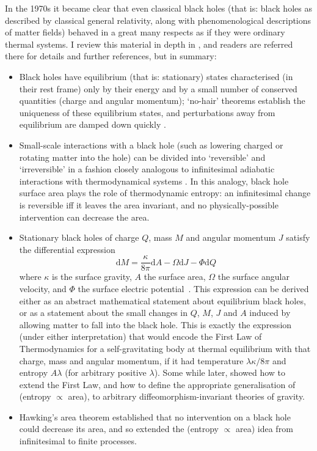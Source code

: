 \documentclass[12pt]{article}
\newcommand{\be}{\begin{equation}}
\newcommand{\ee}{\end{equation}}
\begin{document}
In the 1970s it became clear that even classical black holes (that is: black holes as described by classical general relativity, along with phenomenological descriptions of matter fields) behaved in a great many respects as if they were ordinary thermal systems. I review this material in depth in , and readers are referred there for details and further references, but in summary:
\begin{itemize}
\item Black holes have equilibrium (that is: stationary) states characterised (in their rest frame) only by their energy and by a small number of conserved quantities (charge and angular momentum); `no-hair' theorems \cite{carter1979} establish the uniqueness of these equilibrium states, and perturbations away from equilibrium are damped down quickly \cite[chs.VI-VII]{membraneparadigm}.
\item Small-scale interactions with a black hole (such as lowering charged or rotating matter into the hole) can be divided into `reversible' and `irreversible' in a fashion closely analogous to infinitesimal adiabatic interactions with thermodynamical systems \cite{christodolouruffini}. In this analogy, black hole surface area plays the role of thermodynamic entropy: an infinitesimal change is reversible iff it leaves the area invariant, and no physically-possible intervention can decrease the area. 
\item Stationary black holes of charge $Q$, mass $M$ and angular momentum $J$ satisfy the differential expression 
\be
\mathrm{d}M = \frac{\kappa}{8\pi} \mathrm{d}A - \Omega \mathrm{d}J - \Phi \mathrm{d}Q 
\ee
where $\kappa$ is the surface gravity, $A$ the surface area, $\Omega$ the surface angular velocity, and $\Phi$ the surface electric potential~\cite{bardeenlaws}. This expression can be derived either as an abstract mathematical statement about equilibrium black holes, or as a statement about the small changes in $Q$, $M$, $J$ and $A$ induced by allowing matter to fall into the black hole. This is exactly the expression (under either interpretation) that would encode the First Law of Thermodynamics for a self-gravitating body at thermal equilibrium with that charge, mass and angular momentum, if it had temperature $\lambda \kappa/8\pi$ and entropy $A \lambda$ (for arbitrary positive $\lambda$). Some while later,  showed how to extend the First Law, and how to define the appropriate generalisation of (entropy $\propto$ area), to arbitrary diffeomorphism-invariant theories of gravity.
\item Hawking's area theorem \cite{hawkingareatheorem} established that no intervention on a black hole could decrease its area, and so extended the (entropy $\propto$ area) idea from infinitesimal to finite processes.
\end{itemize}
\end{document}
